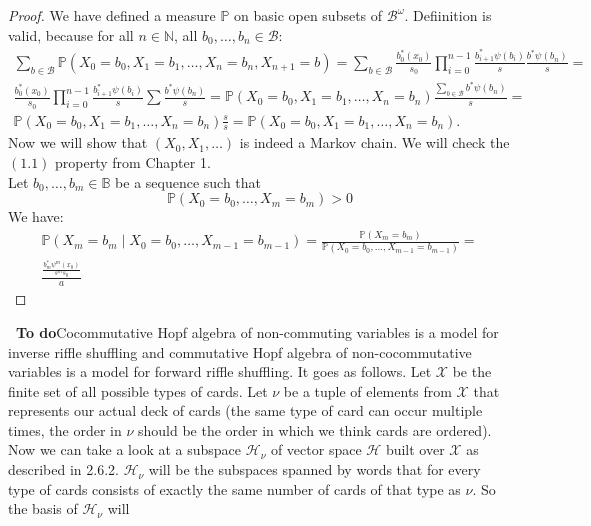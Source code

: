 \documentclass[a4paper, 12pt]{report}
\newcommand{\smalltodo}[1]{\textbf{\ To do}}
\newcommand{\ndotsm}[3]{{#1}_{#2}, \dots, {#1}_{#3}}
\begin{document}
\begin{proof}
We have defined a measure $\mathbb{P}$ on basic open subsets of $\mathcal{B}^\omega$. Defiinition is valid,
because for all $n \in \mathbb{N}$, all $\ndotsm{b}{0}{n} \in \mathcal{B}$:
\begin{gather*}
\sum_{b \in \mathcal{B}}\mathbb{P}(X_0 = b_0, X_1 = b_1, \dots, X_n = b_n, X_{n+1} = b) =
\sum_{b \in \mathcal{B}}\frac{b_0^*(x_0)}{s_0}\prod_{i = 0}^{n-1}
\frac{b_{i+1}^*\psi(b_i)}{s}\frac{b^*\psi(b_n)}{s} = \\
\frac{b_0^*(x_0)}{s_0}\prod_{i=0}^{n-1}\frac{b_{i+1}^*\psi(b_i)}{s}\sum\frac{b^*\psi(b_n)}{s} =
\mathbb{P}(X_0 = b_0, X_1 = b_1, \dots, X_n = b_n)\frac{\sum_{b \in \mathcal{B}}b^*\psi(b_n)}{s} = \\
\mathbb{P}(X_0 = b_0, X_1 = b_1, \dots, X_n = b_n)\frac{s}{s}  = \mathbb{P}(X_0 = b_0, X_1 = b_1, \dots,
X_n = b_n).
\end{gather*}
Now we will show that $(X_0, X_1, \dots)$ is indeed a Markov chain. We will check the $(1.1)$ property from
Chapter 1. \\
Let $\ndotsm{b}{0}{m} \in \mathbb{B}$ be a sequence such that
\begin{equation*}
    \mathbb{P}(X_0 = b_0, \dots, X_m = b_m) > 0
\end{equation*}
We have:
\begin{gather*}
    \mathbb{P}(X_m = b_m \mid X_0 = b_0, \dots, X_{m-1} = b_{m-1}) =
    \frac{\mathbb{P}(X_m = b_m)}{\mathbb{P}(X_0 = b_0, \dots, X_{m-1} = b_{m-1})} = \\
    \frac{\frac{b_m^*\psi^m(x_0)}{s^ms_0}}{a}
\end{gather*}


\end{proof}
\smalltodo\
Cocommutative Hopf algebra of non-commuting variables is a model for inverse riffle shuffling and commutative
Hopf algebra of non-cocommutative variables is a model for forward riffle shuffling. It goes as follows.
Let $\mathcal{X}$ be the finite set of all possible types of cards. Let $\nu$ be a tuple of
elements from $\mathcal{X}$ that represents our actual deck of cards (the same type of card can occur
multiple times, the order in $\nu$ should be the order in which we think cards are ordered). Now we can
take a look at a subspace $\mathcal{H}_\nu$ of vector space $\mathcal{H}$ built over $\mathcal{X}$ as
described in 2.6.2. $\mathcal{H}_\nu$ will be the subspaces spanned by words that for every type of cards
consists of exactly the same number of cards of that type as $\nu$. So the basis of $\mathcal{H}_\nu$ will
\end{document}
